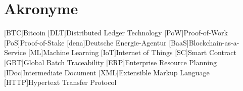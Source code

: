 \section*{Akronyme}            %
\begin{acronym}[HTTP]
	[BTC]{Bitcoin}
	[DLT]{Distributed Ledger Technology}
	[PoW]{Proof-of-Work}
	[PoS]{Proof-of-Stake}
	[dena]{Deutsche Energie-Agentur}
	[BaaS]{Blockchain-as-a-Service}
	[ML]{Machine Learning}
	[IoT]{Internet of Things}
	[SC]{Smart Contract}
  [GBT]{Global Batch Traceability}
  [ERP]{Enterprise Resource Planning}
  [IDoc]{Intermediate Document}
  [XML]{Extensible Markup Language}
  [HTTP]{Hypertext Transfer Protocol}
\end{acronym}


\listoffigures
{}
\newpage
